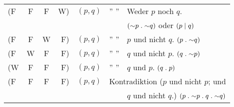 {\begin{scriptsize}
\begin{tabular}{@{}l@{} @{}c@{} @{}c@{} @{}r@{} @{\thinspace}l@{~} @{~}l@{} @{~}l@{}}
\vspace*{0pt}(F&F&F&W) & $(p,q)$ & \phantom{i}'' \quad\quad'' &Weder $p$ noch $q$. \\
\vspace*{0pt}  & & &   &         &                            & \qquad$(\mathord{\sim} p \mathrel{.} \mathord{\sim} q)$ oder $(p \mathrel{\vert} q )$\\
\vspace*{0pt}(F&F&W&F) & $(p,q)$ & \phantom{i}'' \quad\quad'' &$p$ und nicht $q$. \quad$(p \mathrel{.} \mathord{\sim} q)$ \\
\vspace*{0pt}(F&W&F&F) & $(p,q)$ & \phantom{i}'' \quad\quad'' &$q$ und nicht $p$. \quad$(q \mathrel{.} \mathord{\sim} p)$ \\
\vspace*{0pt}(W&F&F&F) & $(p,q)$ & \phantom{i}'' \quad\quad'' &$q$ und $p$. \quad$(q \mathrel{.} p)$ \\
\vspace*{0pt}(F&F&F&F) & $(p,q)$ &\multicolumn{2}{l}{\hspace*{-7pt}Kontradiktion ($p$ und nicht $p$; und} \\
\vspace*{0pt}  & & &   &         &                            & $q$ und nicht $q$.) \quad$(p \mathrel{.} \mathord{\sim} p \mathrel{.} q \mathrel{.} \mathord{\sim} q)$ \\
\end{tabular}\end{scriptsize}}
%
